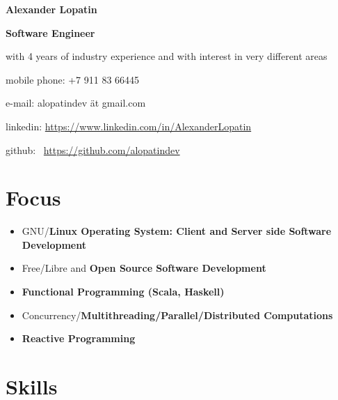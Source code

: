 \begin{center}
\fontsize{18pt}{10pt}\selectfont
\bfseries Alexander Lopatin\mdseries

\vspace{5pt}

\fontsize{14pt}{10pt}\selectfont
\bfseries Software Engineer\mdseries

\fontsize{12pt}{10pt}\selectfont
with 4 years of industry experience and with interest in very different areas

\noindent\makebox[\linewidth]{\rule{\paperwidth}{0.4pt}}

\end{center}
{
\begin{flushright}
\fontsize{9pt}{8pt}\selectfont
\item mobile phone: +7 911 83 66445
\item e-mail: alopatindev ät gmail.com
\item linkedin: \href{https://www.linkedin.com/in/AlexanderLopatin}{https://www.linkedin.com/in/AlexanderLopatin}
\item github: \
\href{https://github.com/alopatindev?tab=repositories}{https://github.com/alopatindev}
\end{flushright}
}

\fontsize{11pt}{12pt}\selectfont

\section*{Focus}

\begin{itemize}
\item GNU/\bfseries Linux \mdseries Operating System: \bfseries Client \mdseries and Server side Software Development
\item Free/Libre and \bfseries Open Source \mdseries Software Development
\item \bfseries Functional \mdseries Programming (Scala, Haskell)
\item Concurrency/\bfseries Multithreading\mdseries/Parallel/\bfseries Distributed \mdseries Computations
\item \bfseries Reactive \mdseries Programming
\end{itemize}

\section*{Skills}

